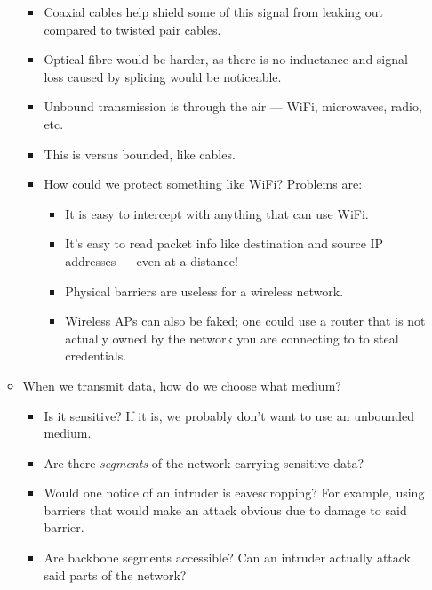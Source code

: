 \documentclass{article}
\begin{document}
\begin{itemize}
\begin{itemize}
\begin{itemize}
                    \item Coaxial cables help shield some of this signal from leaking out compared to twisted pair cables.
                    \item Optical fibre would be harder, as there is no inductance and signal loss caused by splicing would be noticeable.
                    \item Unbound transmission is through the air --- WiFi, microwaves, radio, etc.
                    \item This is versus bounded, like cables.
                    \item How could we protect something like WiFi?  Problems are:
                        \begin{itemize}
                            \item It is easy to intercept with anything that can use WiFi.
                            \item It's easy to read packet info like destination and source IP addresses --- even at a distance!
                            \item Physical barriers are useless for a wireless network.
                            \item Wireless APs can also be faked; one could use a router that is not actually owned by the network you are connecting to to steal credentials.
                        \end{itemize}
                \end{itemize}
            \item When we transmit data, how do we choose what medium?
                \begin{itemize}
                    \item Is it sensitive?  If it is, we probably don't want to use an unbounded medium.
                    \item Are there \emph{segments} of the network carrying sensitive data?
                    \item Would one notice of an intruder is eavesdropping?  For example, using barriers that would make an attack obvious due to damage to said barrier.
                    \item Are backbone segments accessible?  Can an intruder actually attack said parts of the network?
                \end{itemize}
        \end{itemize}
\end{itemize}
\end{document}
